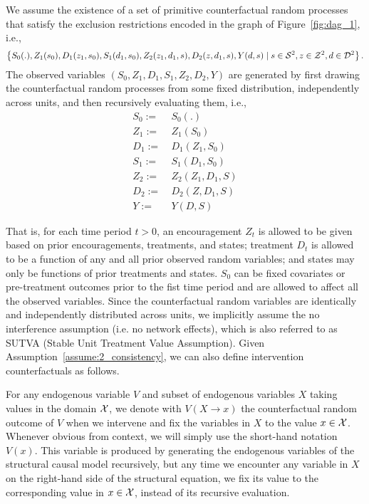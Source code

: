 \begin{assumption}\label{assume:scm}\label{assume:2_consistency} We assume the existence of a set of primitive counterfactual random processes that satisfy the exclusion restrictions encoded in the graph of Figure~\ref{fig:dag_1}, i.e.,
\begin{align}\label{eqn:counterfactuals}
\left\{S_0(.), Z_1(s_0), D_1(z_1, s_0), S_1(d_1, s_0), Z_2(z_1, d_1, s), D_2(z, d_1, s), Y(d, s)\mid s\in {\cal S}^2, z\in {\cal Z}^2, d\in {\cal D}^2\right\}.
\end{align}
The observed variables $(S_0, Z_1, D_1, S_1, Z_2, D_2, Y)$ are generated by first drawing the  counterfactual random processes from some fixed distribution, independently across units, and then recursively evaluating them, i.e.,
\begin{align*}
S_0 :=~& S_0(.)\\
Z_1 :=~& Z_{1}(S_0)\\
D_1 :=~& D_{1}(Z_1, S_0)\\
S_1 :=~& S_{1}(D_1, S_0)\\
Z_2 :=~& Z_{2}(Z_1, D_1, S)\\
D_2 :=~& D_{2}(Z, D_1, S)\\
Y :=~& Y(D, S)
\end{align*}
\end{assumption}
\noindent
That is, for each time period $t > 0$, an encouragement $Z_t$ is allowed to be given based on prior encouragements, treatments, and states; treatment $D_t$ is allowed to be a function of any and all prior observed random variables; and states may only be functions of prior treatments and states.
$S_0$ can be fixed covariates or pre-treatment outcomes prior to the fist time period and are allowed to affect all the observed variables.
Since the counterfactual random variables are identically and independently distributed across units, we implicitly assume the no interference assumption (i.e. no network effects), which is also referred to as SUTVA (Stable Unit Treatment Value Assumption).
Given Assumption~\ref{assume:2_consistency}, we can also define intervention counterfactuals as follows. 
\begin{definition}\label{defn:int-cnt}
 For any endogenous variable $V$ and subset of endogenous variables $X$ taking values in the domain ${\cal X}$, we denote with $V(X\to x)$ the counterfactual random outcome of $V$ when we intervene and fix the variables in $X$ to the value $x\in {\cal X}$. Whenever obvious from context, we will simply use the short-hand notation $V(x)$. This variable is produced by generating the endogenous variables of the structural causal model recursively, but any time we encounter any variable in $X$ on the right-hand side of the structural equation, we fix its value to the corresponding value in $x\in {\cal X}$, instead of its recursive evaluation.   
\end{definition}
